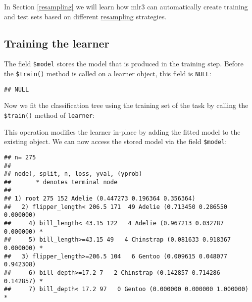 \documentclass[
]{scrbook}
\newenvironment{Shaded}{\begin{snugshade}}{\end{snugshade}}
\newcommand{\AttributeTok}[1]{\textcolor[rgb]{0.77,0.63,0.00}{#1}}
\newcommand{\FunctionTok}[1]{\textcolor[rgb]{0.00,0.00,0.00}{#1}}
\newcommand{\NormalTok}[1]{#1}
\newcommand{\SpecialCharTok}[1]{\textcolor[rgb]{0.00,0.00,0.00}{#1}}
\renewenvironment{Shaded} {\begin{snugshade}\small} {\end{snugshade}}
\begin{document}
In Section \ref{resampling} we will learn how mlr3 can automatically create training and test sets based on different \protect\hyperlink{resampling}{resampling} strategies.

\hypertarget{training}{%
\subsection{Training the learner}\label{training}}

The field \texttt{\$model} stores the model that is produced in the training step.
Before the \texttt{\$train()} method is called on a learner object, this field is \texttt{NULL}:

\begin{Shaded}
\end{Shaded}

\begin{verbatim}
## NULL
\end{verbatim}

Now we fit the classification tree using the training set of the task by calling the \texttt{\$train()} method of \texttt{learner}:

\begin{Shaded}
\end{Shaded}

This operation modifies the learner in-place by adding the fitted model to the existing object.
We can now access the stored model via the field \texttt{\$model}:

\begin{Shaded}
\end{Shaded}

\begin{verbatim}
## n= 275 
## 
## node), split, n, loss, yval, (yprob)
##       * denotes terminal node
## 
## 1) root 275 152 Adelie (0.447273 0.196364 0.356364)  
##   2) flipper_length< 206.5 171  49 Adelie (0.713450 0.286550 0.000000)  
##     4) bill_length< 43.15 122   4 Adelie (0.967213 0.032787 0.000000) *
##     5) bill_length>=43.15 49   4 Chinstrap (0.081633 0.918367 0.000000) *
##   3) flipper_length>=206.5 104   6 Gentoo (0.009615 0.048077 0.942308)  
##     6) bill_depth>=17.2 7   2 Chinstrap (0.142857 0.714286 0.142857) *
##     7) bill_depth< 17.2 97   0 Gentoo (0.000000 0.000000 1.000000) *
\end{verbatim}
\end{document}
